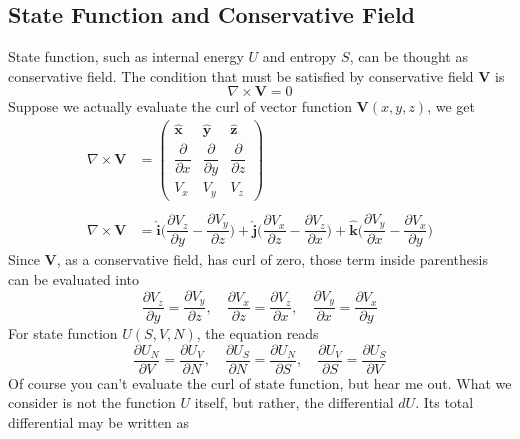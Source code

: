 \documentclass[../main.tex]{subfiles}
\begin{document}
\subsection{State Function and Conservative Field}
State function, such as internal energy \(U \) and entropy \(S \), can be thought as conservative field. The condition that must be satisfied by conservative field $\mathbf{V}$ is
\begin{equation*}
    \nabla\times \mathbf{V}=0
\end{equation*}
Suppose we actually evaluate the curl of vector function $\mathbf{V}(x,y,z)$, we get
\begin{align*}
    \nabla\times \mathbf{V}&=\begin{pmatrix}
        \mathbf{\hat{x}} & \mathbf{\hat{y}} & \mathbf{\hat{z}}\\
        \dfrac{\partial }{\partial x} & \dfrac{\partial }{\partial y} & \dfrac{\partial }{\partial z}\\
        V_x& V_y & V_z
    \end{pmatrix}\\
    \\
    \nabla\times \mathbf{V}&=
    \mathbf{\hat{i}} \biggl(\dfrac{\partial V_z}{\partial y} -\dfrac{\partial V_y}{\partial z}\biggr)+ 
    \mathbf{\hat{j}} \biggl(\dfrac{\partial V_x}{\partial z}-\dfrac{\partial V_z}{\partial x} \biggr) + 
    \mathbf{\hat{k}}\biggl( \dfrac{\partial V_y}{\partial x}-\dfrac{\partial V_x}{\partial y}\biggr)
\end{align*} 
Since \textbf{V}, as a conservative field, has curl of zero, those term inside parenthesis can be evaluated into
\begin{equation*}
    \dfrac{\partial V_z}{\partial y} =\dfrac{\partial V_y}{\partial z},\quad
    \dfrac{\partial V_x}{\partial z}=\dfrac{\partial V_z}{\partial x},\quad
    \dfrac{\partial V_y}{\partial x}=\dfrac{\partial V_x}{\partial y}
\end{equation*}
For state function \(U(S,V,N)\), the equation reads
\begin{equation*}
    \dfrac{\partial U_N}{\partial V} =\dfrac{\partial U_V}{\partial N},\quad
    \dfrac{\partial U_S}{\partial N}=\dfrac{\partial U_N}{\partial S},\quad
    \dfrac{\partial U_V}{\partial S}=\dfrac{\partial U_S}{\partial V}
\end{equation*}
Of course you can't evaluate the curl of state function, but hear me out. What we consider is not the function $U$ itself, but rather, the differential $dU$. Its total differential may be written as 
\end{document}
